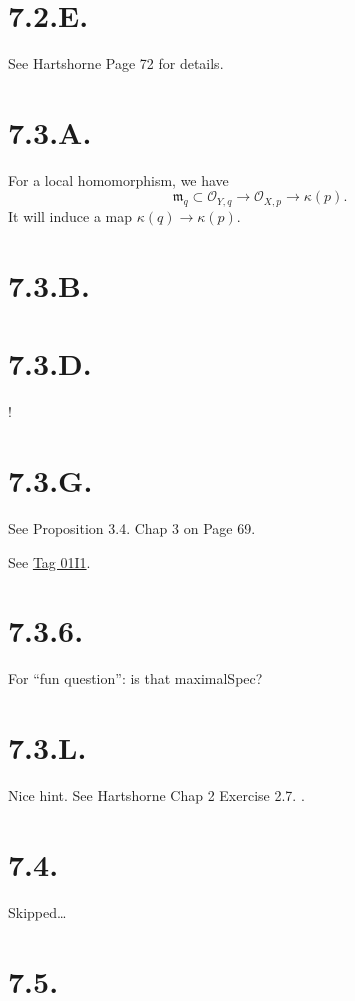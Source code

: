 \section{7.2.E.}

See Hartshorne \cite{hartshorne2013algebraic} Page 72 for details.

\section{7.3.A.}

For a local homomorphism, we have 
\[\mathfrak m_{q}\subset \mathscr O_{Y,q}\to \mathscr O_{X,p}\to\kappa (p).\]It will induce a map $\kappa(q)\to\kappa(p)$.

\section{7.3.B.}

\section{7.3.D.}

!

\section{7.3.G.}

See \cite{gortz2020algebraic} Proposition 3.4. Chap 3 on Page 69.

See \href{https://stacks.math.columbia.edu/tag/01I1}{Tag 01I1}.
\section{7.3.6.}

For \enquote{fun question}: is that maximalSpec?

\section{7.3.L.}

Nice hint. See Hartshorne Chap 2 Exercise 2.7. \cite{hartshorne2013algebraic}.

\section{7.4.}

Skipped\dots

\section{7.5.}

